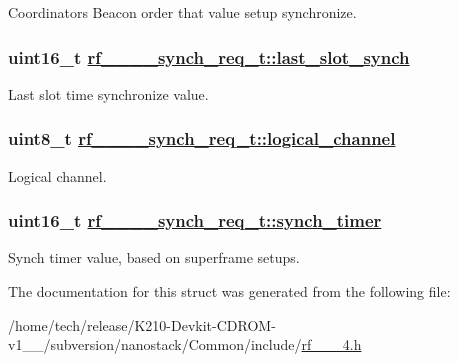 Coordinators Beacon order that value setup synchronize. \hypertarget{structrf__802__15__4__synch__req__t_82ae23950d975bb6d356beaf05bbab50}{
\subsubsection[last\_\-slot\_\-synch]{\setlength{\rightskip}{0pt plus 5cm}uint16\_\-t \hyperlink{structrf__802__15__4__synch__req__t_82ae23950d975bb6d356beaf05bbab50}{rf\_\_\_\_\-synch\_\-req\_\-t::last\_\-slot\_\-synch}}}
\label{structrf__802__15__4__synch__req__t_82ae23950d975bb6d356beaf05bbab50}


Last slot time synchronize value. \hypertarget{structrf__802__15__4__synch__req__t_5cde0c85fe36632ff8267a2173e187cd}{
\subsubsection[logical\_\-channel]{\setlength{\rightskip}{0pt plus 5cm}uint8\_\-t \hyperlink{structrf__802__15__4__synch__req__t_5cde0c85fe36632ff8267a2173e187cd}{rf\_\_\_\_\-synch\_\-req\_\-t::logical\_\-channel}}}
\label{structrf__802__15__4__synch__req__t_5cde0c85fe36632ff8267a2173e187cd}


Logical channel. \hypertarget{structrf__802__15__4__synch__req__t_cebd13aabb32a619c972e9edbf9b26f2}{
\subsubsection[synch\_\-timer]{\setlength{\rightskip}{0pt plus 5cm}uint16\_\-t \hyperlink{structrf__802__15__4__synch__req__t_cebd13aabb32a619c972e9edbf9b26f2}{rf\_\_\_\_\-synch\_\-req\_\-t::synch\_\-timer}}}
\label{structrf__802__15__4__synch__req__t_cebd13aabb32a619c972e9edbf9b26f2}


Synch timer value, based on superframe setups. 

The documentation for this struct was generated from the following file:\begin{CompactItemize}
\item 
/home/tech/release/K210-Devkit-CDROM-v1\_\_/subversion/nanostack/Common/include/\hyperlink{rf__802__15__4_8h}{rf\_\_\_\-4.h}\end{CompactItemize}
